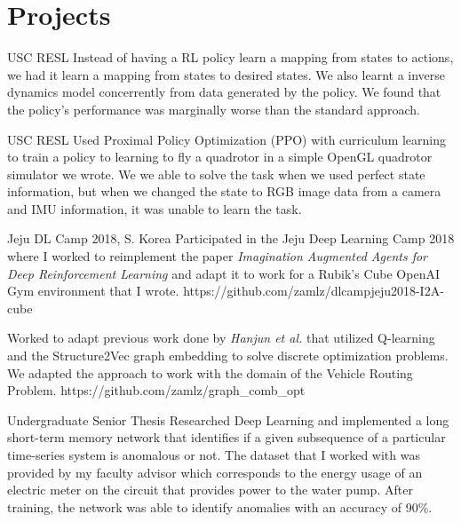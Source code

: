 \documentclass{cv}
\begin{document}
\section{Projects}
\begin{adjustwidth}{0.5cm}{0.5cm}

{USC RESL}
{Instead of having a RL policy learn a mapping from states to actions, we had
it learn a mapping from states to desired states. We also learnt a inverse
dynamics model concerrently from data generated by the policy. We found that
the policy's performance was marginally worse than the standard approach.}{}

{USC RESL}
{Used Proximal Policy Optimization (PPO) with curriculum learning to train a
policy to learning to fly a quadrotor in a simple OpenGL quadrotor simulator we
wrote. We we able to solve the task when we used perfect state information, but
when we changed the state to RGB image data from a camera and IMU information,
it was unable to learn the task.}{}

{Jeju DL Camp 2018, S. Korea}
{Participated in the Jeju Deep Learning Camp 2018 where I worked to
reimplement the paper \textit{Imagination Augmented Agents for
Deep Reinforcement Learning} and adapt it to work for a Rubik's Cube OpenAI
Gym environment that I wrote.}
{https://github.com/zamlz/dlcampjeju2018-I2A-cube}


{Worked to adapt previous work done by \textit{Hanjun et al.} that utilized
Q-learning and the Structure2Vec graph embedding to solve discrete optimization
problems. We adapted the approach to work with the domain of the Vehicle
Routing Problem.}
{https://github.com/zamlz/graph_comb_opt}

{Undergraduate Senior Thesis}
{Researched Deep Learning and implemented a long short-term memory
network that identifies if a given subsequence of a particular
time-series system is anomalous or not. The dataset that I worked with
was provided by my faculty advisor which corresponds to the energy usage
of an electric meter on the circuit that provides power to the water
pump. After training, the network was able to identify anomalies with
an accuracy of 90\%.}{}


\end{adjustwidth}
\end{document}

